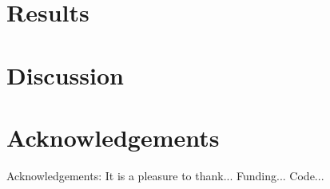 \documentclass[usenatbib]{mnras}
\begin{document}

\section{Results}


\section{Discussion}


\section*{Acknowledgements}
Acknowledgements:
It is a pleasure to thank...
Funding...
Code...





\label{lastpage}
\end{document}
